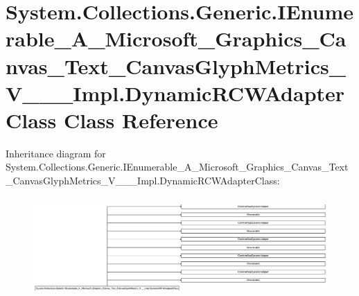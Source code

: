 \hypertarget{class_system_1_1_collections_1_1_generic_1_1_i_enumerable___a___microsoft___graphics___canvas___94d704a1edd2cb726b59f263f921f64d}{}\section{System.\+Collections.\+Generic.\+I\+Enumerable\+\_\+\+A\+\_\+\+Microsoft\+\_\+\+Graphics\+\_\+\+Canvas\+\_\+\+Text\+\_\+\+Canvas\+Glyph\+Metrics\+\_\+\+V\+\_\+\+\_\+\+\_\+\+Impl.\+Dynamic\+R\+C\+W\+Adapter\+Class Class Reference}
\label{class_system_1_1_collections_1_1_generic_1_1_i_enumerable___a___microsoft___graphics___canvas___94d704a1edd2cb726b59f263f921f64d}
Inheritance diagram for System.\+Collections.\+Generic.\+I\+Enumerable\+\_\+\+A\+\_\+\+Microsoft\+\_\+\+Graphics\+\_\+\+Canvas\+\_\+\+Text\+\_\+\+Canvas\+Glyph\+Metrics\+\_\+\+V\+\_\+\+\_\+\+\_\+\+Impl.\+Dynamic\+R\+C\+W\+Adapter\+Class\+:\begin{figure}[H]
\begin{center}
\leavevmode
\includegraphics[height=3.830846cm]{class_system_1_1_collections_1_1_generic_1_1_i_enumerable___a___microsoft___graphics___canvas___94d704a1edd2cb726b59f263f921f64d}
\end{center}
\end{figure}
